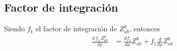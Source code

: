 \documentclass[11pt]{article}
\begin{document}
\subsection{Factor de integración}
Siendo $f_1$ el factor de integración de $Z_{ab}^k$, entonces
\begin{align}
 \frac{d\,f_1\,Z_{ab}^k}{d\rho} 
 &= \frac{df_1}{d\rho} Z_{ab}^k + f_1 \frac{d}{d\rho} Z_{ab}^k \\
\end{align}
\end{document}
